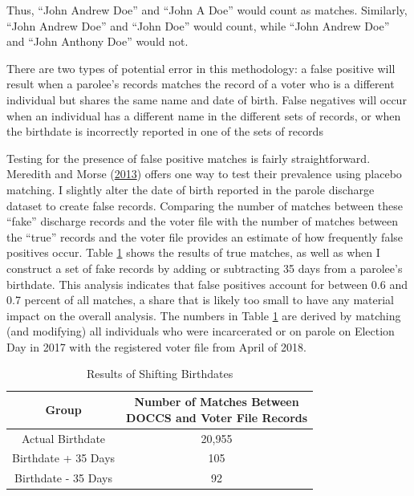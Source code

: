 \documentclass[]{article}
\begin{document}
Thus, ``John Andrew Doe'' and ``John A Doe'' would count as matches. Similarly, ``John Andrew Doe'' and ``John Doe'' would count, while ``John Andrew Doe'' and ``John Anthony Doe'' would not.

There are two types of potential error in this methodology: a false positive will result when a parolee's records matches the record of a voter who is a different individual but shares the same name and date of birth. False negatives will occur when an individual has a different name in the different sets of records, or when the birthdate is incorrectly reported in one of the sets of records

Testing for the presence of false positive matches is fairly straightforward. Meredith and Morse (\protect\hyperlink{ref-Meredith2013}{2013}) offers one way to test their prevalence using placebo matching. I slightly alter the date of birth reported in the parole discharge dataset to create false records. Comparing the number of matches between these ``fake'' discharge records and the voter file with the number of matches between the ``true'' records and the voter file provides an estimate of how frequently false positives occur. Table \ref{tab:change-dobs} shows the results of true matches, as well as when I construct a set of fake records by adding or subtracting 35 days from a parolee's birthdate. This analysis indicates that false positives account for between 0.6 and 0.7 percent of all matches, a share that is likely too small to have any material impact on the overall analysis. The numbers in Table \ref{tab:change-dobs} are derived by matching (and modifying) all individuals who were incarcerated or on parole on Election Day in 2017 with the registered voter file from April of 2018.

\begin{table}[H]

\caption{\label{tab:shift-dobs-chunk}\label{tab:change-dobs} Results of Shifting Birthdates}
\centering
\begin{tabular}{cc}
\toprule
Group & \makecell[l]{Number of Matches Between\\DOCCS and Voter File Records}\\
\midrule
Actual Birthdate & 20,955\\
Birthdate + 35 Days & 105\\
Birthdate - 35 Days & 92\\
\bottomrule
\end{tabular}
\end{table}
\end{document}
